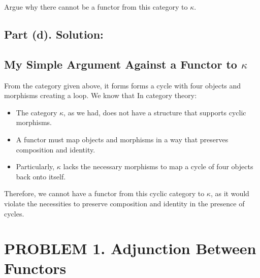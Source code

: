 \documentclass{article}
\begin{document}
Argue why there cannot be a functor from this category to $\kappa$.

\subsection*{Part (d). Solution:}


\subsection*{My Simple Argument Against a Functor to \(\kappa\)}

From the category given above, it forms forms a cycle with four objects and morphisms creating a loop. 
We know that In category theory:

\begin{itemize}    
    \item The category \(\kappa\), as we had, does not have a structure that supports cyclic morphisms.
    \item A functor must map objects and morphisms in a way that preserves composition and identity.
    \item Particularly, \(\kappa\) lacks the necessary morphisms to map a cycle of four objects back onto itself.
\end{itemize}

Therefore, we cannot have a functor from this cyclic category to \(\kappa\), 
as it would violate the necessities to preserve composition and identity in the presence of cycles.



\newpage

\section*{PROBLEM 1. Adjunction Between Functors  }
\end{document}
